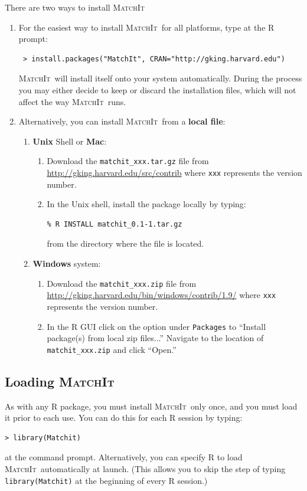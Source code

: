 \documentclass[oneside,letterpaper,titlepage]{article}
\newcommand{\MatchIt}{\textsc{MatchIt}}
\begin{document}
There are two ways to install \MatchIt\: 

\begin{enumerate} 
\item For the easiest way to install \MatchIt\ for all platforms,
  type at the R prompt:
\begin{verbatim}
 > install.packages("MatchIt", CRAN="http://gking.harvard.edu")
\end{verbatim}

  \noindent \MatchIt\ will  install itself onto
  your system automatically.  During the process you may either decide
  to keep or discard the installation files, which will not affect the
  way \MatchIt\ runs.

\item Alternatively, you can install \MatchIt\ from a \textbf{local file}:
  \begin{enumerate} 
  \item \textbf{Unix} Shell or \textbf{Mac}:
    \begin{enumerate}
    \item Download the \texttt{matchit\_xxx.tar.gz} file from
      \url{http://gking.harvard.edu/src/contrib} where \texttt{xxx}
      represents the version number.
    \item In the Unix shell, install the package locally by typing:
\begin{verbatim}
% R INSTALL matchit_0.1-1.tar.gz   
\end{verbatim}
      from the directory where the file is located.
    \end{enumerate}
  \item \textbf{Windows} system:
    \begin{enumerate}
    \item Download the \texttt{matchit\_xxx.zip} file from 
      \url{http://gking.harvard.edu/bin/windows/contrib/1.9/} where
      \texttt{xxx} represents the version number.
    \item In the R GUI click on the option under \texttt{Packages} to
      ``Install package(s) from local zip files...''  Navigate to the
      location of \texttt{matchit\_xxx.zip} and click ``Open.''
    \end{enumerate}
  \end{enumerate}
\end{enumerate}

\subsection{Loading \MatchIt}
As with any R package, you must install \MatchIt\ only once, and you
must load it prior to each use.  You can do this for each R session by
typing:
\begin{verbatim}
> library(Matchit) 
\end{verbatim}
at the command prompt.  Alternatively, you can specify R to load
\MatchIt\ automatically at launch.  (This allows you to skip the step
of typing {\tt library(Matchit)} at the beginning of every R session.)
 
\end{document}
